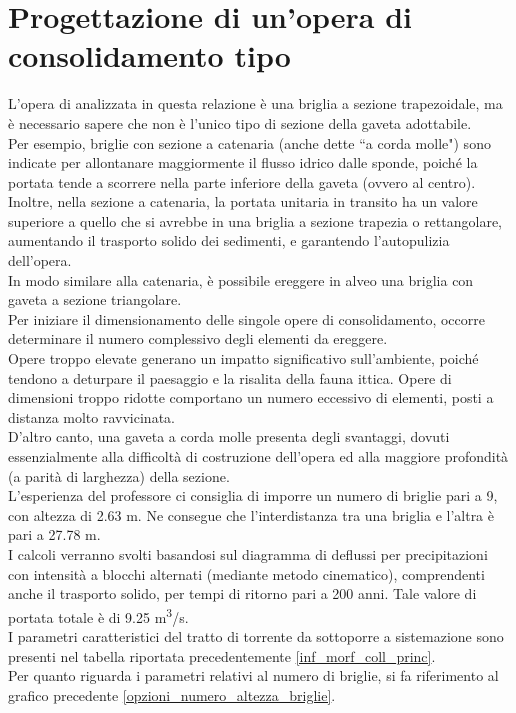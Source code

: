 \section{Progettazione di un'opera di consolidamento tipo}
L'opera di analizzata in questa relazione è una briglia a sezione trapezoidale, ma è necessario sapere che non è l'unico tipo di sezione della gaveta adottabile.\\
Per esempio, briglie con sezione a catenaria (anche dette ``a corda molle") sono indicate per allontanare maggiormente il flusso idrico dalle sponde, poiché la portata tende a scorrere nella parte inferiore della gaveta (ovvero al centro). Inoltre, nella sezione a catenaria, la portata unitaria in transito ha un valore superiore a quello che si avrebbe in una briglia a sezione trapezia o rettangolare, aumentando il trasporto solido dei sedimenti, e garantendo l'autopulizia dell'opera.\\
In modo similare alla catenaria, è possibile ereggere in alveo una briglia con gaveta a sezione triangolare.\\
Per iniziare il dimensionamento delle singole opere di consolidamento, occorre determinare il numero complessivo degli elementi da ereggere.\\
Opere troppo elevate generano un impatto significativo sull'ambiente, poiché tendono a deturpare il paesaggio e la risalita della fauna ittica. Opere di dimensioni troppo ridotte comportano un numero eccessivo di elementi, posti a distanza molto ravvicinata.\\
D'altro canto, una gaveta a corda molle presenta degli svantaggi, dovuti essenzialmente alla difficoltà di costruzione dell'opera ed alla maggiore profondità (a parità di larghezza) della sezione.\\
L'esperienza del professore ci consiglia di imporre un numero di briglie pari a 9, con altezza di 2.63 m. Ne consegue che l'interdistanza tra una briglia e l'altra è pari a 27.78 m.\\
I calcoli verranno svolti basandosi sul diagramma di deflussi per precipitazioni con intensità a blocchi alternati (mediante metodo cinematico), comprendenti anche il trasporto solido, per tempi di ritorno pari a 200 anni. Tale valore di portata totale è di 9.25 \unit{m^3/s}.\\
I parametri caratteristici del tratto di torrente da sottoporre a sistemazione sono presenti nel tabella riportata precedentemente \ref{inf_morf_coll_princ}.\\
Per quanto riguarda i parametri relativi al numero di briglie, si fa riferimento al grafico precedente \ref{opzioni_numero_altezza_briglie}.
